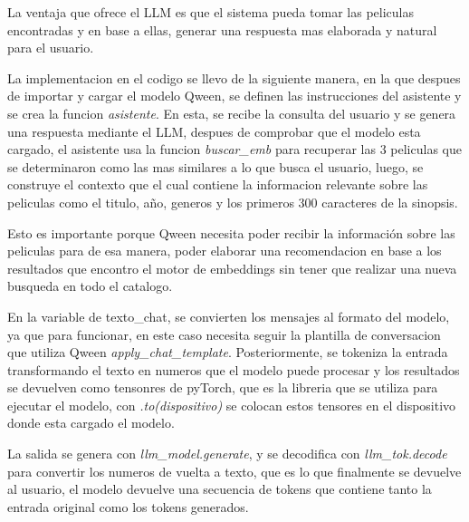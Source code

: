 La ventaja que ofrece el LLM es que el sistema pueda tomar las peliculas encontradas y en base a ellas, generar una respuesta mas elaborada y natural para el usuario.

La implementacion en el codigo se llevo de la siguiente manera, en la que despues de importar y cargar el modelo Qween, se definen las instrucciones del asistente y se crea la funcion \textit{asistente}. En esta, se recibe la consulta del usuario y se genera una respuesta mediante el LLM, despues de comprobar que el modelo esta cargado, el asistente usa la funcion \textit{buscar\_emb} para recuperar las 3 peliculas que se determinaron como las mas similares a lo que busca el usuario, luego, se construye el contexto que el cual contiene la informacion relevante sobre las peliculas como el titulo, año, generos y los primeros 300 caracteres de la sinopsis.

Esto es importante porque Qween necesita poder recibir la información sobre las peliculas para de esa manera, poder elaborar una recomendacion en base a los resultados que encontro el motor de embeddings sin tener que realizar una nueva busqueda en todo el catalogo.

En la variable de texto\_chat, se convierten los mensajes al formato del modelo, ya que para funcionar, en este caso necesita seguir la plantilla de conversacion que utiliza Qween \textit{apply\_chat\_template}. Posteriormente, se tokeniza la entrada transformando el texto en numeros que el modelo puede procesar y los resultados se devuelven como tensonres de pyTorch, que es la libreria que se utiliza para ejecutar el modelo, con \textit{.to(dispositivo)} se colocan estos tensores en el dispositivo donde esta cargado el modelo.

La salida se genera con \textit{llm\_model.generate}, y se decodifica con \textit{llm\_tok.decode} para convertir los numeros de vuelta a texto, que es lo que finalmente se devuelve al usuario, el modelo devuelve una secuencia de tokens que contiene tanto la entrada original como los tokens generados.

